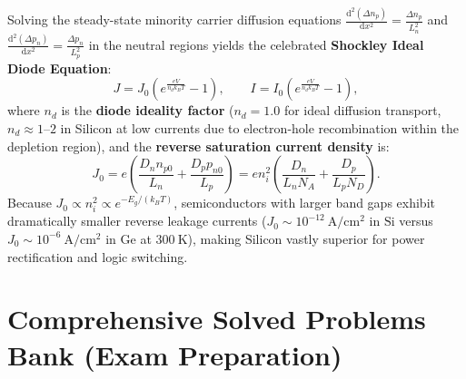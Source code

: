 \documentclass[11pt,a4paper]{article}
\newcommand{\dvtwo}[2]{\frac{\mathrm{d}^2#1}{\mathrm{d}#2^2}}
\begin{document}
Solving the steady-state minority carrier diffusion equations $\dvtwo{(\Delta n_p)}{x} = \frac{\Delta n_p}{L_n^2}$ and $\dvtwo{(\Delta p_n)}{x} = \frac{\Delta p_n}{L_p^2}$ in the neutral regions yields the celebrated \textbf{Shockley Ideal Diode Equation}:
\begin{equation}
    \boxed{J = J_0\left(e^{\frac{eV}{n_d k_B T}} - 1\right), \qquad I = I_0\left(e^{\frac{eV}{n_d k_B T}} - 1\right),}
    \label{eq:shockley_diode_master}
\end{equation}
where $n_d$ is the \textbf{diode ideality factor} ($n_d = 1.0$ for ideal diffusion transport, $n_d \approx 1\text{--}2$ in Silicon at low currents due to electron-hole recombination within the depletion region), and the \textbf{reverse saturation current density} is:
\begin{equation}
    \boxed{J_0 = e\left(\frac{D_n n_{p0}}{L_n} + \frac{D_p p_{n0}}{L_p}\right) = e n_i^2\left(\frac{D_n}{L_n N_A} + \frac{D_p}{L_p N_D}\right).}
    \label{eq:j0_master}
\end{equation}
Because $J_0 \propto n_i^2 \propto e^{-E_g/(k_B T)}$, semiconductors with larger band gaps exhibit dramatically smaller reverse leakage currents ($J_0 \sim 10^{-12}\ \mathrm{A/cm^2}$ in $\text{Si}$ versus $J_0 \sim 10^{-6}\ \mathrm{A/cm^2}$ in $\text{Ge}$ at $300\ \mathrm{K}$), making Silicon vastly superior for power rectification and logic switching.

\section{Comprehensive Solved Problems Bank (Exam Preparation)}
\label{sec:solved_bank}
\end{document}
